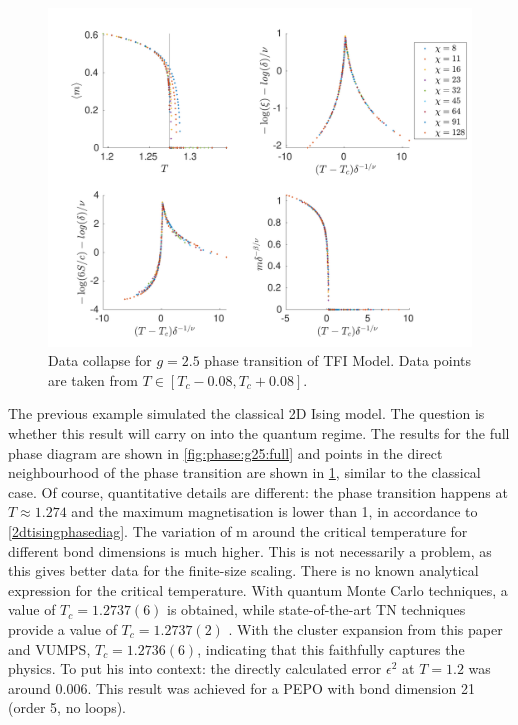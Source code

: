 \begin{figure}[!htbp]
  \center
  \includegraphics[width=\textwidth]{Figuren/phasediag/g25/zoomed.pdf}
  \caption{ Data collapse for $g=2.5$ phase transition of \Gls{TFI} Model. Data points are taken from $T \in \left[ T_c -0.08, T_c +0.08 \right]$. }
  \label{fig:phase:g25:zoomed}
\end{figure}

The previous example simulated the classical 2D Ising model. The question is whether this result will carry on into the quantum regime. The results for the full phase diagram are shown in \cref{fig:phase:g25:full} and points in the direct neighbourhood of the phase transition are shown in \cref{fig:phase:g25:zoomed}, similar to the classical case. Of course, quantitative details are different: the phase transition happens at $T\approx 1.274$ and the maximum magnetisation is lower than 1, in accordance to \cref{2dtisingphasediag}. The variation of m around the critical temperature for different bond dimensions is much higher. This is not necessarily a problem, as this gives better data for the finite-size scaling.
There is no known analytical expression for the critical temperature. With quantum Monte Carlo techniques, a value of $T_c=1.2737(6)$ is obtained, while state-of-the-art \Gls{TN} techniques provide a value of $T_c=1.2737(2)$ \cite{Czarnik2019}. With the cluster expansion from this paper and \Gls{VUMPS}, $T_c=1.2736(6)$, indicating that this faithfully captures the physics. To put his into context: the directly calculated error $\epsilon^{2}$  at $T=1.2$ was around $0.006$. This result was achieved for a PEPO with bond dimension 21 (order 5, no loops).

